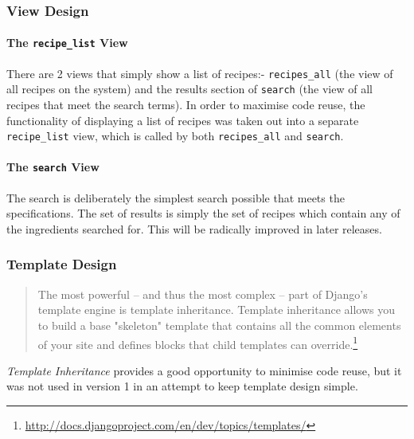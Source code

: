 \subsubsection{View Design}

\paragraph{The \texttt{recipe\_list} View}

There are 2 views that simply show a list of recipes:- \texttt{recipes\_all} (the view of all recipes on the system) and the results section of \texttt{search} (the view of all recipes that meet the search terms). In order to maximise code reuse, the functionality of displaying a list of recipes was taken out into a separate \texttt{recipe\_list} view, which is called by both \texttt{recipes\_all} and \texttt{search}.

\paragraph{The \texttt{search} View}

The search is deliberately the simplest search possible that meets the specifications. The set of results is simply the set of recipes which contain any of the ingredients searched for. This will be radically improved in later releases.

\subsubsection{Template Design}

\begin{quote}
The most powerful -- and thus the most complex -- part of Django's template engine is template inheritance. Template inheritance allows you to build a base "skeleton" template that contains all the common elements of your site and defines blocks that child templates can override.\footnote{\url{http://docs.djangoproject.com/en/dev/topics/templates/}}
\end{quote}
\textit{Template Inheritance} provides a good opportunity to minimise code reuse, but it was not used in version 1 in an attempt to keep template design simple.













